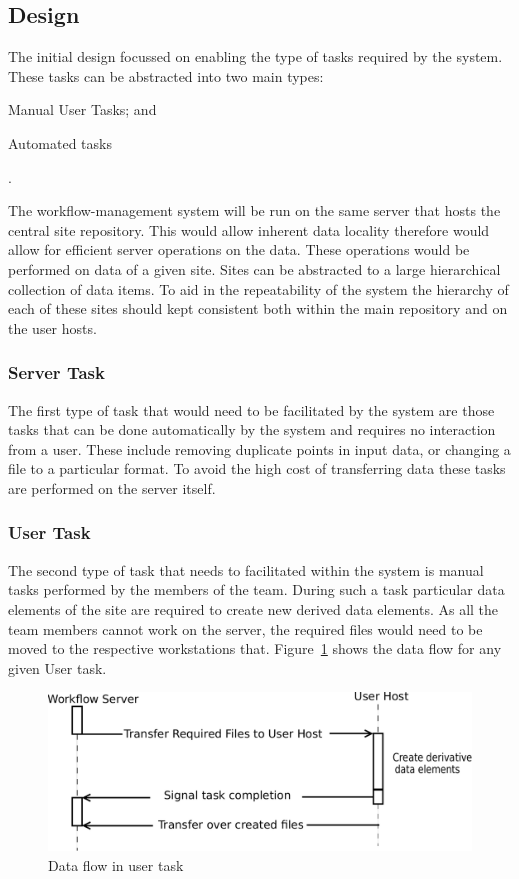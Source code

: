 \documentclass[12pt,a4paper]{report}
\begin{document}
\subsection{Design}
The initial design focussed on enabling the type of tasks required by the system.
These tasks can be abstracted into two main types: \begin{inparaenum}[(i)] \item
Manual User Tasks; and \item Automated tasks\end{inparaenum}.


The workflow-management system will be run on the same server that hosts the central
site repository. This would allow inherent data locality therefore would allow for
efficient server operations on the data. These operations would be performed on data
of a given site. Sites can be abstracted to a large hierarchical collection of data
items. To aid in the repeatability of the system the hierarchy of each of these
sites should kept consistent both within the main repository and on the user hosts.

\subsubsection*{Server Task}
The first type of task that would need to be facilitated by the system are those
tasks that can be done automatically by the system and requires no interaction
from a user. These include removing duplicate points in input data, or changing
a file to a particular format. To avoid the high cost of transferring data these
tasks are performed on the server itself.

\subsubsection*{User Task}
The second type of task that needs to facilitated within the system is manual
tasks performed by the members of the team. During such a task particular data
elements of the site are required to create new derived data elements. As all the
team members cannot work on the server, the required files would need to be moved
to the respective workstations that. Figure~\ref{data_flow} shows the data flow for any given
User task.
\begin{figure}[!h]
    \begin{center}
        \includegraphics[scale=0.5]{figures/data_flow.pdf}
    \end{center}
    \caption{Data flow in user task}
    \label{data_flow}
\end{figure}
\end{document}
